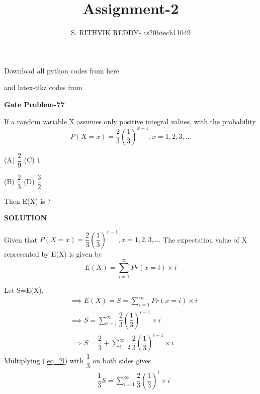 \documentclass[a4paper]{article}
\title{Assignment-2}
\author{S. RITHVIK REDDY- cs20btech11049}
\date{}
\begin{document}
\maketitle
\noindent
Download all python codes from here

\begin{multicols*}{2}
\noindent
{}
    
\vspace{0.3cm}
and latex-tikz codes from  

\vspace{0.3cm}  
    
   
\vspace{0.5cm}
\textbf{Gate Problem-77}
\vspace{0.5cm}

If a random variable X assumes only positive integral values, with the probability 
$$P(X=x)=\dfrac{2}{3}\left(\dfrac{1}{3}\right)^{x-1} , x=1,2,3,...$$

(A) $\dfrac{2}{9}$ \hspace{2 cm} (C) 1

\vspace{0.5 cm}
(B) $\dfrac{2}{3}$ \hspace{2 cm} (D) $\dfrac{3}{2}$

Then E(X) is ?

\vspace{0.5cm}
\textbf{SOLUTION}
\vspace{0.5cm}

Given that $P(X=x)=\dfrac{2}{3}\left(\dfrac{1}{3}\right)^{x-1} , x=1,2,3,...$
The expectation value of X represented by E(X) is given by
$$E(X)=\sum_{i=1}^{\infty} Pr(x=i)\times i$$

Let S=E(X),
\begin{align}
&\implies E(X)=S=\sum_{i=1}^{\infty} Pr(x=i)\times i\\
&\implies S=\sum_{i=1}^{\infty} \dfrac{2}{3}\left(\dfrac{1}{3}\right)^{i-1} \times i \label{eq_2}   \\
&\implies S=\dfrac{2}{3}+\sum_{i=2}^{\infty} \dfrac{2}{3}\left(\dfrac{1}{3}\right)^{i-1} \times i  \label{eq_3}
\end{align}
Multiplying (\ref{eq_2}) with  $\dfrac{1}{3}$ on both sides gives
\begin{align}
&\dfrac{1}{3}S=\sum_{i=1}^{\infty} \dfrac{2}{3}\left(\dfrac{1}{3}\right)^{i} \times i \label{eq_4}
\end{align}


\end{multicols*}
\end{document}
